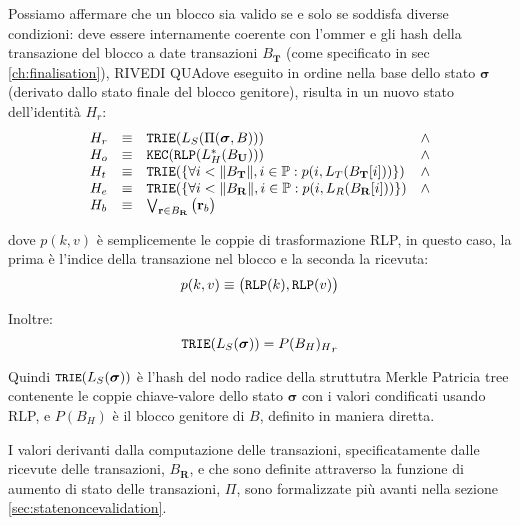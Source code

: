 \documentclass[9pt,oneside]{amsart}
\begin{document}
\begin{multicols}{2}
Possiamo affermare che un blocco sia valido se e solo se soddisfa diverse condizioni: deve essere internamente coerente con l'ommer e gli hash della transazione del blocco a date transazioni $B_\mathbf{T}$ (come specificato in sec \ref{ch:finalisation}), RIVEDI QUAdove eseguito in ordine nella base dello stato $\boldsymbol{\sigma}$ (derivato dallo stato finale del blocco genitore), risulta in un nuovo stato dell'identità $H_r$:
\begin{equation}
\begin{array}[t]{lclc}
H_r &\equiv& \mathtt{\small TRIE}(L_S(\Pi(\boldsymbol{\sigma}, B))) & \wedge \\
H_o &\equiv& \mathtt{\small KEC}(\mathtt{\small RLP}(L_H^*(B_\mathbf{U}))) & \wedge \\
H_t &\equiv& \mathtt{\small TRIE}(\{\forall i < \lVert B_\mathbf{T} \rVert, i \in \mathbb{P}: p(i, L_T(B_\mathbf{T}[i]))\}) & \wedge \\
H_e &\equiv& \mathtt{\small TRIE}(\{\forall i < \lVert B_\mathbf{R} \rVert, i \in \mathbb{P}: p(i, L_R(B_\mathbf{R}[i]))\}) & \wedge \\
H_b &\equiv& \bigvee_{\mathbf{r} \in B_\mathbf{R}} \big( \mathbf{r}_b \big)
\end{array}
\end{equation}

dove $p(k, v)$ è semplicemente le coppie di trasformazione RLP, in questo caso, la prima è l'indice della transazione nel blocco e la seconda la ricevuta:
\begin{equation}
p(k, v) \equiv \big( \mathtt{\small RLP}(k), \mathtt{\small RLP}(v) \big)
\end{equation}

Inoltre:
\begin{equation}
\mathtt{\small TRIE}(L_S(\boldsymbol{\sigma})) = {P(B_H)_H}_r
\end{equation}

Quindi $\texttt{\small TRIE}(L_S(\boldsymbol{\sigma}))$ è l'hash del nodo radice della struttutra Merkle Patricia tree contenente le coppie chiave-valore dello stato $\boldsymbol{\sigma}$ con i valori condificati usando RLP, e $P(B_H)$ è il blocco genitore di $B$, definito in maniera diretta.

I valori derivanti dalla computazione delle transazioni, specificatamente dalle ricevute delle transazioni, $B_\mathbf{R}$, e che sono definite attraverso la funzione di aumento di stato delle transazioni, $\Pi$, sono formalizzate più avanti nella sezione \ref{sec:statenoncevalidation}.


\end{multicols}
\end{document}
